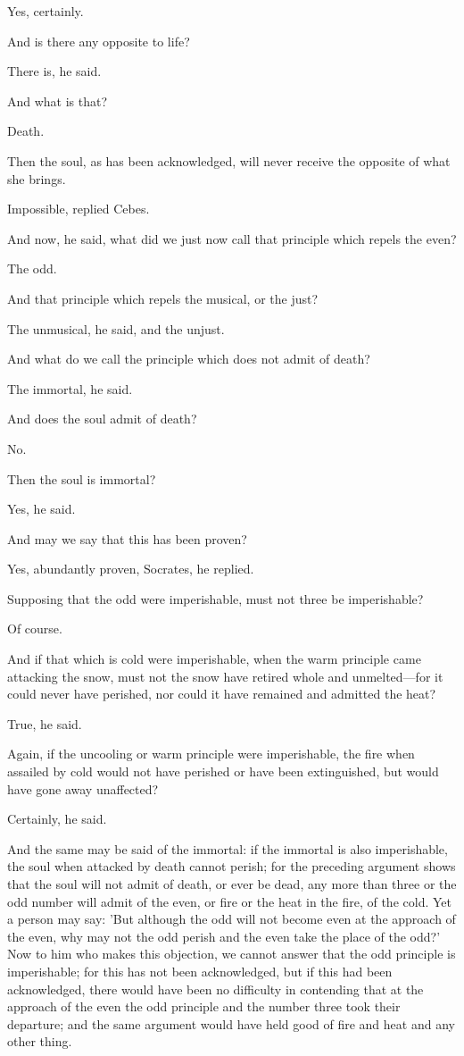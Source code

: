 Yes, certainly.

And is there any opposite to life?

There is, he said.

And what is that?

Death.

Then the soul, as has been acknowledged, will never receive the opposite
of what she brings.

Impossible, replied Cebes.

And now, he said, what did we just now call that principle which repels
the even?

The odd.

And that principle which repels the musical, or the just?

The unmusical, he said, and the unjust.

And what do we call the principle which does not admit of death?

The immortal, he said.

And does the soul admit of death?

No.

Then the soul is immortal?

Yes, he said.

And may we say that this has been proven?

Yes, abundantly proven, Socrates, he replied.

Supposing that the odd were imperishable, must not three be imperishable?

Of course.

And if that which is cold were imperishable, when the warm principle came
attacking the snow, must not the snow have retired whole and unmelted—for
it could never have perished, nor could it have remained and admitted the
heat?

True, he said.

Again, if the uncooling or warm principle were imperishable, the fire when
assailed by cold would not have perished or have been extinguished, but
would have gone away unaffected?

Certainly, he said.

And the same may be said of the immortal: if the immortal is also
imperishable, the soul when attacked by death cannot perish; for the
preceding argument shows that the soul will not admit of death, or ever be
dead, any more than three or the odd number will admit of the even, or
fire or the heat in the fire, of the cold. Yet a person may say: 'But
although the odd will not become even at the approach of the even, why may
not the odd perish and the even take the place of the odd?' Now to him who
makes this objection, we cannot answer that the odd principle is
imperishable; for this has not been acknowledged, but if this had been
acknowledged, there would have been no difficulty in contending that at
the approach of the even the odd principle and the number three took their
departure; and the same argument would have held good of fire and heat and
any other thing.


